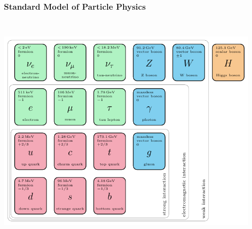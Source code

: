 \documentclass[10pt,t]{beamer}
\begin{document}
\begin{frame}\centering
\frametitle{Standard Model of Particle Physics}
\vspace*{-2.5\baselineskip}
\begin{columns}
~\\[-\baselineskip]
    \includegraphics[width=\textwidth]{standardmodell-en}
~\\[4cm]
     \\[0.5cm]
\end{columns}

\vspace*{-5pt}
\end{frame}
\end{document}
